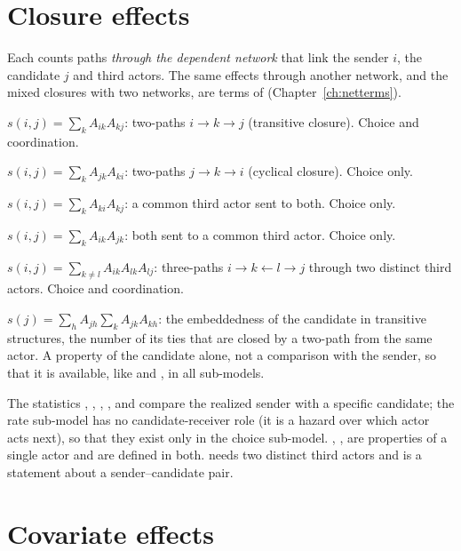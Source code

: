 \section{Closure effects}

Each counts paths \emph{through the dependent network} that link the sender $i$, the candidate $j$ and third actors. The same effects through another network, and the mixed closures with two networks, are terms of  (Chapter~\ref{ch:netterms}).
\begin{description}[style=nextline,nosep]
  \item[\opt{trans}] $s(i,j)=\sum_k A_{ik}A_{kj}$: two-paths $i\to k\to j$ (transitive closure). Choice and coordination.
  \item[\opt{cycle}] $s(i,j)=\sum_k A_{jk}A_{ki}$: two-paths $j\to k\to i$ (cyclical closure). Choice only.
  \item[\opt{commonsender}] $s(i,j)=\sum_k A_{ki}A_{kj}$: a common third actor sent to both. Choice only.
  \item[\opt{commonreceiver}] $s(i,j)=\sum_k A_{ik}A_{jk}$: both sent to a common third actor. Choice only.
  \item[\opt{four}] $s(i,j)=\sum_{k\neq l}A_{ik}A_{lk}A_{lj}$: three-paths $i\to k\leftarrow l\to j$ through two distinct third actors. Choice and coordination.
  \item[\opt{nodetrans}] $s(j)=\sum_h A_{jh}\sum_k A_{jk}A_{kh}$: the embeddedness of the candidate in transitive structures, the number of its ties that are closed by a two-path from the same actor. A property of the candidate alone, not a comparison with the sender, so that it is available, like  and , in all sub-models.
\end{description}
The statistics , , , ,  and  compare the realized sender with a specific candidate; the rate sub-model has no candidate-receiver role (it is a hazard over which actor acts next), so that they exist only in the choice sub-model. , ,  are properties of a single actor and are defined in both.  needs two distinct third actors and is a statement about a sender--candidate pair.

\section{Covariate effects}\label{sec:covariates}

